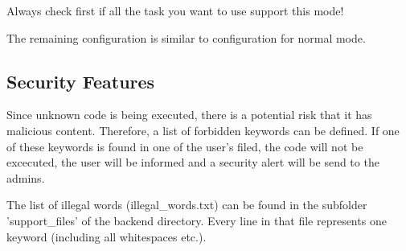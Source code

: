 Always check first if all the task you want to use support this mode!

The remaining configuration is similar to configuration for normal mode.

\subsection{Security Features}\label{sub:securityfeatures}
Since unknown code is being executed, there is a potential risk that it has malicious content.
Therefore, a list of forbidden keywords can be defined. If one of these keywords is found in one of 
the user's filed, the code will not be excecuted, the user will be informed and a security alert 
will be send to the admins.

The list of illegal words (illegal\_words.txt) can be found in the subfolder 'support\_files' of the 
backend directory. Every line in that file represents one keyword (including all whitespaces etc.).

